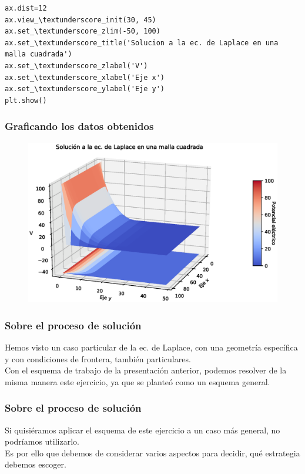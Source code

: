 {\begin{frame}
\begin{lstlisting}[caption=Código que resuelve la ec. de Laplace en una malla cuadrada, style=FormattedNumber, basicstyle=\linespread{1.1}\ttfamily=\small, columns=fullflexible]
ax.dist=12
ax.view_\textunderscore_init(30, 45)
ax.set_\textunderscore_zlim(-50, 100)
ax.set_\textunderscore_title('Solucion a la ec. de Laplace en una malla cuadrada')
ax.set_\textunderscore_zlabel('V')
ax.set_\textunderscore_xlabel('Eje x')
ax.set_\textunderscore_ylabel('Eje y')
plt.show()
\end{lstlisting}
\end{frame}
{
\begin{frame}[fragile]
\frametitle{Graficando los datos obtenidos}
\begin{figure}
	\centering
	\includegraphics[scale=0.55]{Imagenes/ejercicio_Laplace_Potencial_01.eps} 
\end{figure}
\end{frame}
}
\begin{frame}
\frametitle{Sobre el proceso de solución}
Hemos visto un caso particular de la ec. de Laplace, con una geometría específica y con condiciones de frontera, también particulares.
\\
\bigskip
Con el esquema de trabajo de la presentación anterior, podemos resolver de la misma manera este ejercicio, ya que se planteó como un esquema general.
\end{frame}
\begin{frame}
\frametitle{Sobre el proceso de solución}
Si quisiéramos aplicar el esquema de este ejercicio a un caso más general, no podríamos utilizarlo.
\\
\bigskip
Es por ello que debemos de considerar varios aspectos para decidir, qué estrategia debemos escoger.
\end{frame}
}
